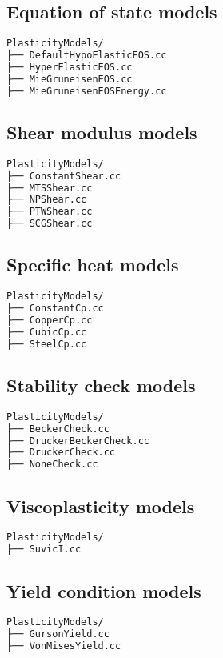 \subsection{Equation of state models}
\begin{lstlisting}[language=sh, backgroundcolor=\color{background}]
PlasticityModels/
├── DefaultHypoElasticEOS.cc
├── HyperElasticEOS.cc
├── MieGruneisenEOS.cc
├── MieGruneisenEOSEnergy.cc
\end{lstlisting}

\subsection{Shear modulus models}
\begin{lstlisting}[language=sh, backgroundcolor=\color{background}]
PlasticityModels/
├── ConstantShear.cc
├── MTSShear.cc
├── NPShear.cc
├── PTWShear.cc
├── SCGShear.cc
\end{lstlisting}

\subsection{Specific heat models}
\begin{lstlisting}[language=sh, backgroundcolor=\color{background}]
PlasticityModels/
├── ConstantCp.cc
├── CopperCp.cc
├── CubicCp.cc
├── SteelCp.cc
\end{lstlisting}

\subsection{Stability check models}
\begin{lstlisting}[language=sh, backgroundcolor=\color{background}]
PlasticityModels/
├── BeckerCheck.cc
├── DruckerBeckerCheck.cc
├── DruckerCheck.cc
├── NoneCheck.cc
\end{lstlisting}

\subsection{Viscoplasticity models}
\begin{lstlisting}[language=sh, backgroundcolor=\color{background}]
PlasticityModels/
├── SuvicI.cc
\end{lstlisting}

\subsection{Yield condition models}
\begin{lstlisting}[language=sh, backgroundcolor=\color{background}]
PlasticityModels/
├── GursonYield.cc
├── VonMisesYield.cc
\end{lstlisting}

